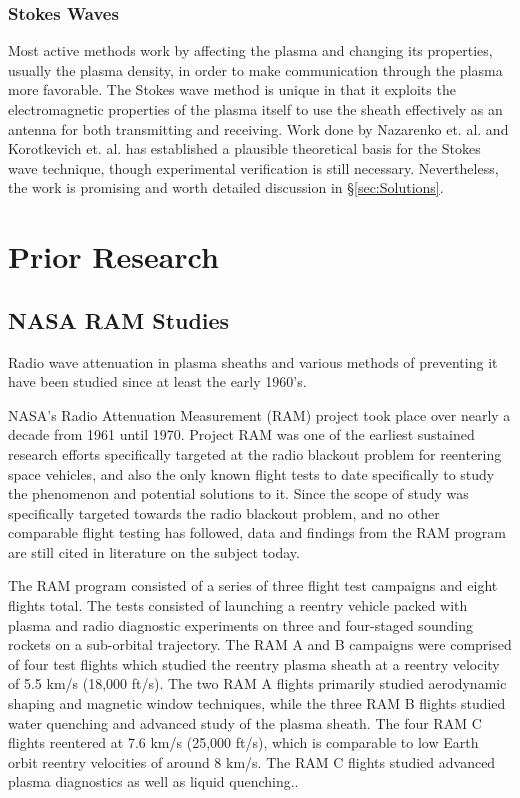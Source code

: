 \documentclass[twocolumn]{article}
\begin{document}
	\subsubsection*{Stokes Waves}
	Most active methods work by affecting the plasma and changing its properties, usually the plasma density, in order to make communication through the plasma more favorable.
	The Stokes wave method is unique in that it exploits the electromagnetic properties of the plasma itself to use the sheath effectively as an antenna for both transmitting and receiving.
	Work done by Nazarenko et. al. and Korotkevich et. al. has established a plausible theoretical basis for the Stokes wave technique, though experimental verification is still necessary.\cite{nazarenko_communication_1994}\cite{korotkevich_communication_2007}
	Nevertheless, the work is promising and worth detailed discussion in \S\ref{sec:Solutions}.

	
	
\section{Prior Research} \label{sec:Prior}
	\subsection*{NASA RAM Studies}
	Radio wave attenuation in plasma sheaths and various methods of preventing it have been studied since at least the early 1960's.
	
	NASA's Radio Attenuation Measurement (RAM) project took place over nearly a decade from 1961 until 1970.
	Project RAM was one of the earliest sustained research efforts specifically targeted at the radio blackout problem for reentering space vehicles, and also the only known flight tests to date specifically to study the phenomenon and potential solutions to it.
	Since the scope of study was specifically targeted towards the radio blackout problem, and no other comparable flight testing has followed, data and findings from the RAM program are still cited in literature on the subject today.
	
	The RAM program consisted of a series of three flight test campaigns and eight flights total.
	The tests consisted of launching a reentry vehicle packed with plasma and radio diagnostic experiments on three and four-staged sounding rockets on a sub-orbital trajectory.
	The RAM A and B campaigns were comprised of four test flights which studied the reentry plasma sheath at a reentry velocity of 5.5 km/s (18,000 ft/s).\cite{huber_entry_1971}
	The two RAM A flights primarily studied aerodynamic shaping and magnetic window techniques, while the three RAM B flights studied water quenching and advanced study of the plasma sheath.
	The four RAM C flights reentered at 7.6 km/s (25,000 ft/s), which is comparable to low Earth orbit reentry velocities of around 8 km/s.
	The RAM C flights studied advanced plasma diagnostics as well as liquid quenching.\cite{huber_entry_1971}.
	
\end{document}
